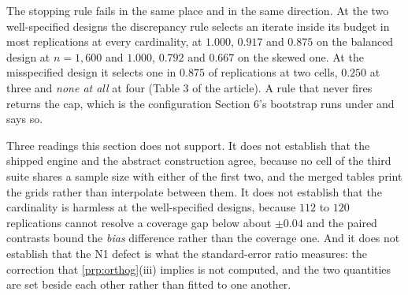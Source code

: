 \documentclass[
  12pt]{article}
\newcommand{\1}[1]{\mathds{1}\left[#1\right]}
\theoremstyle{plain}
\theoremstyle{definition}
\theoremstyle{definition}
\theoremstyle{remark}
\begin{document}
The stopping rule fails in the same place and in the same direction. At the two
well-specified designs the discrepancy rule selects an iterate inside its budget
in most replications at every cardinality, at $1.000$, $0.917$ and $0.875$ on the
balanced design at $n=1{,}600$ and $1.000$, $0.792$ and $0.667$ on the skewed one.
At the misspecified design it selects one in $0.875$ of replications at two cells,
$0.250$ at three and \emph{none at all} at four (Table 3 of the article). A
rule that never fires returns the cap, which is the configuration Section 6's
bootstrap runs under and says so.

Three readings this section does not support. It does not establish that the
shipped engine and the abstract construction agree, because no cell of the third
suite shares a sample size with either of the first two, and the merged tables
print the grids rather than interpolate between them. It does not establish
that the cardinality is harmless at the well-specified designs, because $112$ to
$120$ replications cannot resolve a coverage gap below about $\pm0.04$ and the
paired contrasts bound the \emph{bias} difference rather than the coverage one. And it
does not establish that the N1 defect is what the standard-error ratio measures:
the correction that \cref{prp:orthog}(iii) implies is not computed, and the two
quantities are set beside each other rather than fitted to one another.
\end{document}
